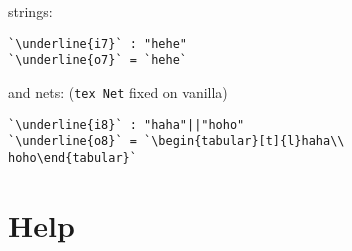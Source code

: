 \documentclass[12pt,a4paper]{amsart}
\begin{document}
strings:
\smallskip
\begin{lstlisting}[language=Macaulay2]
`\underline{i7}` : "hehe"
`\underline{o7}` = `hehe`
\end{lstlisting}
\smallskip

and nets: ({\tt tex Net} fixed on vanilla)
\smallskip
\begin{lstlisting}[language=Macaulay2]
`\underline{i8}` : "haha"||"hoho"
`\underline{o8}` = `\begin{tabular}[t]{l}haha\\
hoho\end{tabular}`
\end{lstlisting}
\smallskip


\section{Help}
\smallskip
\end{document}
